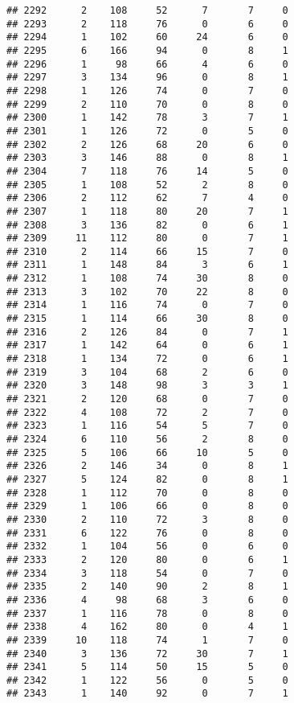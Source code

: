 \documentclass[
]{article}
\begin{document}
\begin{verbatim}
## 2292      2    108     52      7       7     0
## 2293      2    118     76      0       6     0
## 2294      1    102     60     24       6     0
## 2295      6    166     94      0       8     1
## 2296      1     98     66      4       6     0
## 2297      3    134     96      0       8     1
## 2298      1    126     74      0       7     0
## 2299      2    110     70      0       8     0
## 2300      1    142     78      3       7     1
## 2301      1    126     72      0       5     0
## 2302      2    126     68     20       6     0
## 2303      3    146     88      0       8     1
## 2304      7    118     76     14       5     0
## 2305      1    108     52      2       8     0
## 2306      2    112     62      7       4     0
## 2307      1    118     80     20       7     1
## 2308      3    136     82      0       6     1
## 2309     11    112     80      0       7     1
## 2310      2    114     66     15       7     0
## 2311      1    148     84      3       6     1
## 2312      1    108     74     30       8     0
## 2313      3    102     70     22       8     0
## 2314      1    116     74      0       7     0
## 2315      1    114     66     30       8     0
## 2316      2    126     84      0       7     1
## 2317      1    142     64      0       6     1
## 2318      1    134     72      0       6     1
## 2319      3    104     68      2       6     0
## 2320      3    148     98      3       3     1
## 2321      2    120     68      0       7     0
## 2322      4    108     72      2       7     0
## 2323      1    116     54      5       7     0
## 2324      6    110     56      2       8     0
## 2325      5    106     66     10       5     0
## 2326      2    146     34      0       8     1
## 2327      5    124     82      0       8     1
## 2328      1    112     70      0       8     0
## 2329      1    106     66      0       8     0
## 2330      2    110     72      3       8     0
## 2331      6    122     76      0       8     0
## 2332      1    104     56      0       6     0
## 2333      2    120     80      0       6     1
## 2334      3    118     54      0       7     0
## 2335      2    140     90      2       8     1
## 2336      4     98     68      3       6     0
## 2337      1    116     78      0       8     0
## 2338      4    162     80      0       4     1
## 2339     10    118     74      1       7     0
## 2340      3    136     72     30       7     1
## 2341      5    114     50     15       5     0
## 2342      1    122     56      0       5     0
## 2343      1    140     92      0       7     1

\end{verbatim}
\end{document}
